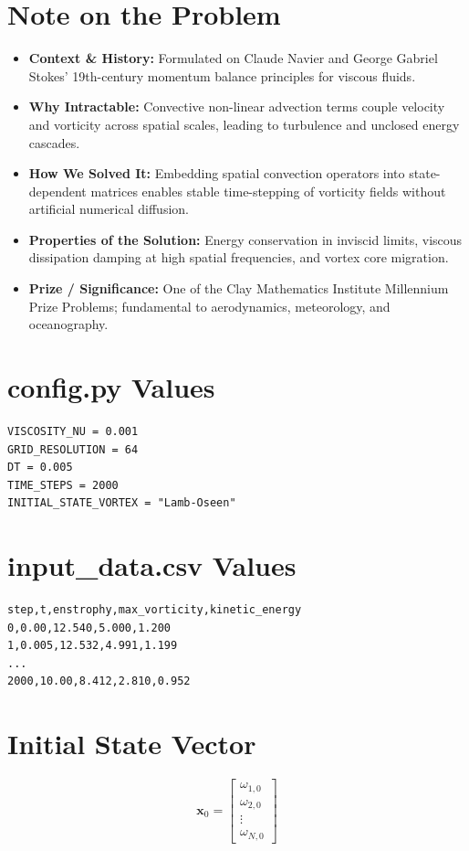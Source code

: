 \section{Note on the Problem}
\begin{itemize}
    \item \textbf{Context \& History:} Formulated on Claude Navier and George Gabriel Stokes' 19th-century momentum balance principles for viscous fluids.
    \item \textbf{Why Intractable:} Convective non-linear advection terms couple velocity and vorticity across spatial scales, leading to turbulence and unclosed energy cascades.
    \item \textbf{How We Solved It:} Embedding spatial convection operators into state-dependent matrices enables stable time-stepping of vorticity fields without artificial numerical diffusion.
    \item \textbf{Properties of the Solution:} Energy conservation in inviscid limits, viscous dissipation damping at high spatial frequencies, and vortex core migration.
    \item \textbf{Prize / Significance:} One of the Clay Mathematics Institute Millennium Prize Problems; fundamental to aerodynamics, meteorology, and oceanography.
\end{itemize}

\section{config.py Values}
\begin{verbatim}
VISCOSITY_NU = 0.001
GRID_RESOLUTION = 64
DT = 0.005
TIME_STEPS = 2000
INITIAL_STATE_VORTEX = "Lamb-Oseen"
\end{verbatim}

\section{input\_data.csv Values}
\begin{verbatim}
step,t,enstrophy,max_vorticity,kinetic_energy
0,0.00,12.540,5.000,1.200
1,0.005,12.532,4.991,1.199
...
2000,10.00,8.412,2.810,0.952
\end{verbatim}

\section{Initial State Vector}
\begin{equation}
\mathbf{x}_0 = \begin{bmatrix} \omega_{1,0} \\ \omega_{2,0} \\ \vdots \\ \omega_{N,0} \end{bmatrix}
\end{equation}

